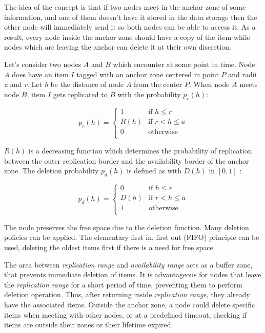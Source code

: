 The idea of the concept is that if two nodes meet in the anchor zone of some
information, and one of them doesn't have it stored in the data storage then the
other node will immediately send it so both nodes can be able to access it. As a
result, every node inside the anchor zone should have a copy of the item while
nodes which are leaving the anchor can delete it at their own discretion.

Let's consider two nodes $A$ and $B$ which encounter at some point in time. Node
$A$ does have an item $I$ tagged with an anchor zone centered in point $P$ and
radii {\it a} and {\it r}. Let {\it h} be the distance of node $A$ from the
center $P$.
When node $A$ meets node $B$, item $I$ gets replicated to $B$ with the
probability $p_r(h)$:

$$p_r(h) = \begin{cases}
	1 & \text{if } h \leq r \\
	R\left(h\right) & \text{if } r < h \leq a \\
	0 & \text{otherwise} \\
\end{cases}$$

$R(h)$ is a decreasing function which determines the probability of replication
between the outer replication border and the availability border of the anchor
zone.
The deletion probability $p_d(h)$ is defined as with $D(h)$ in $[0, 1]$ :

$$p_d(h) = \begin{cases}
	0 & \text{if } h \leq r \\
	D\left(h\right) & \text{if } r < h \leq a \\
	1 & \text{otherwise} \\
\end{cases}$$

The node preserves the free space due to the deletion function. Many deletion
policies can be applied. The elementary first in, first out (FIFO) principle
can be used, deleting the oldest items first if there is a need for free space.

The area between {\it replication range} and {\it availability range} acts as a
buffer zone, that prevents immediate deletion of items. It is advantageous
for nodes that leave the {\it replication range} for a short period of time,
preventing them to perform deletion operation. Thus, after returning inside
{\it replication range}, they already have the associated items. Outside the
anchor zone, a node could delete specific items when meeting with other nodes,
or at a predefined timeout, checking if items are outside their zones or their
lifetime expired.

